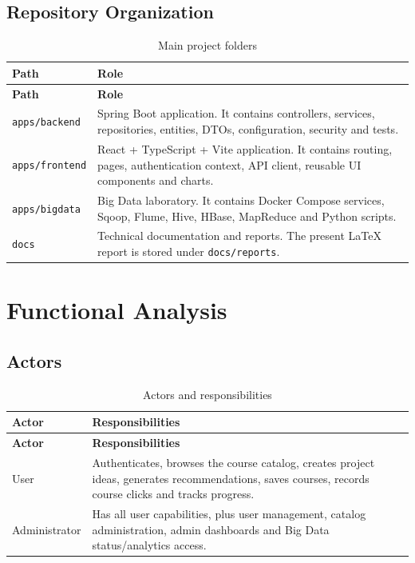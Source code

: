 \documentclass[12pt,a4paper]{report}
\begin{document}
\section{Repository Organization}
\begin{longtable}{p{}p{}}
\caption{Main project folders}\\
\toprule
\textbf{Path} & \textbf{Role}\\
\midrule
\endfirsthead
\toprule
\textbf{Path} & \textbf{Role}\\
\midrule
\endhead
\texttt{apps/backend} & Spring Boot application. It contains controllers, services, repositories, entities, DTOs, configuration, security and tests.\\
\texttt{apps/frontend} & React + TypeScript + Vite application. It contains routing, pages, authentication context, API client, reusable UI components and charts.\\
\texttt{apps/bigdata} & Big Data laboratory. It contains Docker Compose services, Sqoop, Flume, Hive, HBase, MapReduce and Python scripts.\\
\texttt{docs} & Technical documentation and reports. The present LaTeX report is stored under \texttt{docs/reports}.\\
\bottomrule
\end{longtable}

\chapter{Functional Analysis}

\section{Actors}
\begin{longtable}{p{}p{}}
\caption{Actors and responsibilities}\\
\toprule
\textbf{Actor} & \textbf{Responsibilities}\\
\midrule
\endfirsthead
\toprule
\textbf{Actor} & \textbf{Responsibilities}\\
\midrule
\endhead
User & Authenticates, browses the course catalog, creates project ideas, generates recommendations, saves courses, records course clicks and tracks progress.\\
Administrator & Has all user capabilities, plus user management, catalog administration, admin dashboards and Big Data status/analytics access.\\
\bottomrule
\end{longtable}
\end{document}
